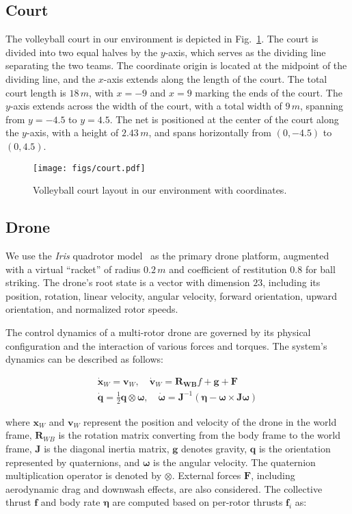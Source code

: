 \subsection{Court}
The volleyball court in our environment is depicted in Fig.~\ref{fig:app:court}. The court is divided into two equal halves by the $y$-axis, which serves as the dividing line separating the two teams. The coordinate origin is located at the midpoint of the dividing line, and the $x$-axis extends along the length of the court. The total court length is $18\,{m}$, with $x = -9$ and $x = 9$ marking the ends of the court. The $y$-axis extends across the width of the court, with a total width of $9\,{m}$, spanning from $y = -4.5$ to $y = 4.5$. The net is positioned at the center of the court along the $y$-axis, with a height of $2.43\,{m}$, and spans horizontally from $(0, -4.5)$ to $(0, 4.5)$.

\begin{figure}[h]
    \centering
    \texttt{[image: figs/court.pdf]}
    \caption{Volleyball court layout in our environment with coordinates.}
    \label{fig:app:court}
\end{figure}


\subsection{Drone}
We use the \textit{Iris} quadrotor model~\cite{furrer2016rotors} as the primary drone platform, augmented with a virtual ``racket'' of radius $0.2\,{m}$ and coefficient of restitution $0.8$ for ball striking. The drone's root state is a vector with dimension $23$, including its position, rotation, linear velocity, angular velocity, forward orientation, upward orientation, and normalized rotor speeds.

The control dynamics of a multi-rotor drone are governed by its physical configuration and the interaction of various forces and torques. The system's dynamics can be described as follows:

\begin{align}
\bm{\dot{x}}_W = \bm{v}_W, \quad \bm{\dot{v}}_W = \bm{R_{WB}}f + \bm{g} + \bm{F} \\
\bm{\dot{q}} = \frac{1}{2} \bm{q} \otimes \bm{\omega}, \quad \bm{\dot{\omega}} = \bm{J}^{-1} (\bm{\eta} - \bm{\omega} \times \bm{J} \bm{\omega})
\end{align}

where $\bm{x}_W$ and $\bm{v}_W$ represent the position and velocity of the drone in the world frame, $\bm{R}_{WB}$ is the rotation matrix converting from the body frame to the world frame, $\bm{J}$ is the diagonal inertia matrix, $\bm{g}$ denotes gravity, $\bm{q}$ is the orientation represented by quaternions, and $\bm{\omega}$ is the angular velocity. The quaternion multiplication operator is denoted by $\otimes$. External forces $\bm{F}$, including aerodynamic drag and downwash effects, are also considered. The collective thrust $\bm{f}$ and body rate $\bm{\eta}$ are computed based on per-rotor thrusts $\bm{f}_i$ as:

